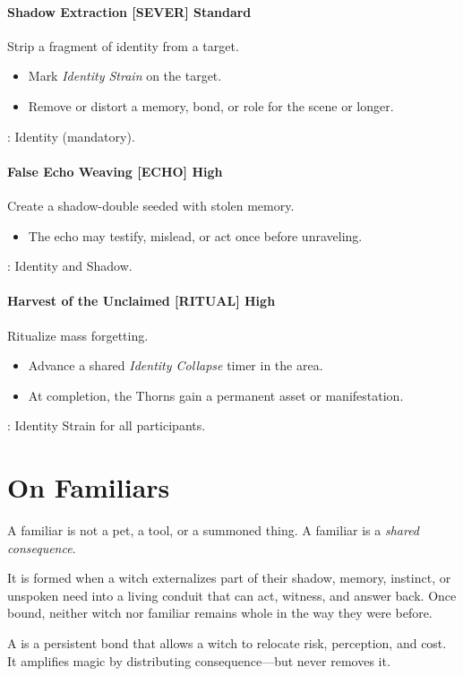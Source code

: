 \paragraph{Shadow Extraction \hfill \textnormal{[SEVER] Standard}}
Strip a fragment of identity from a target.
\begin{itemize}
  \item Mark \emph{Identity Strain} on the target.
  \item Remove or distort a memory, bond, or role for the scene or longer.
\end{itemize}
: Identity (mandatory).

\paragraph{False Echo Weaving \hfill \textnormal{[ECHO] High}}
Create a shadow-double seeded with stolen memory.
\begin{itemize}
  \item The echo may testify, mislead, or act once before unraveling.
\end{itemize}
: Identity and Shadow.

\paragraph{Harvest of the Unclaimed \hfill \textnormal{[RITUAL] High}}
Ritualize mass forgetting.
\begin{itemize}
  \item Advance a shared \emph{Identity Collapse} timer in the area.
  \item At completion, the Thorns gain a permanent asset or manifestation.
\end{itemize}
: Identity Strain for all participants.

\section{On Familiars}
A familiar is not a pet, a tool, or a summoned thing.
A familiar is a \emph{shared consequence}.

It is formed when a witch externalizes part of their shadow, memory, instinct, or unspoken need into a living conduit that can act, witness, and answer back. Once bound, neither witch nor familiar remains whole in the way they were before.

\begin{RuleBox}
A  is a persistent bond that allows a witch to relocate risk, perception, and cost. It amplifies magic by distributing consequence---but never removes it.
\end{RuleBox}

